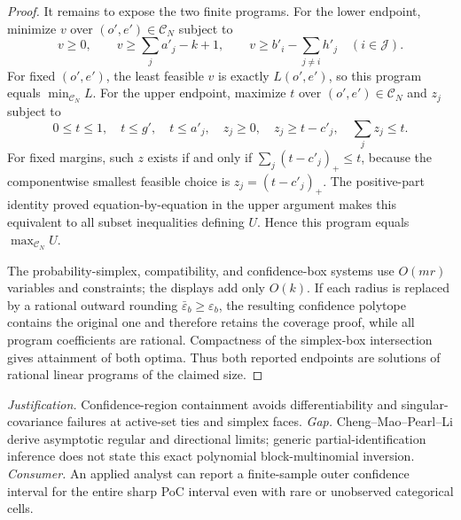 \documentclass{article}
\begin{document}
\begin{proof}
It remains to expose the two finite programs.  For the lower endpoint, minimize \(v\) over \((o',e')\in\mathcal C_N\) subject to
\[
 v\geq0,
 \qquad v\geq\sum_ja'_j-k+1,
 \qquad v\geq b'_i-\sum_{j\ne i}h'_j\quad(i\in\mathcal J).
\]
For fixed \((o',e')\), the least feasible \(v\) is exactly \(L(o',e')\), so this program equals \(\min_{\mathcal C_N}L\).  For the upper endpoint, maximize \(t\) over \((o',e')\in\mathcal C_N\) and \(z_j\) subject to
\[
 0\leq t\leq1,
 \quad t\leq g',
 \quad t\leq a'_j,
 \quad z_j\geq0,
 \quad z_j\geq t-c'_j,
 \quad \sum_jz_j\leq t.
\]
For fixed margins, such \(z\) exists if and only if \(\sum_j(t-c'_j)_+\leq t\), because the componentwise smallest feasible choice is \(z_j=(t-c'_j)_+\).  The positive-part identity proved equation-by-equation in the upper argument makes this equivalent to all subset inequalities defining \(U\).  Hence this program equals \(\max_{\mathcal C_N}U\).

The probability-simplex, compatibility, and confidence-box systems use \(O(mr)\) variables and constraints; the displays add only \(O(k)\).  If each radius is replaced by a rational outward rounding \(\bar\varepsilon_b\geq\varepsilon_b\), the resulting confidence polytope contains the original one and therefore retains the coverage proof, while all program coefficients are rational.  Compactness of the simplex-box intersection gives attainment of both optima.  Thus both reported endpoints are solutions of rational linear programs of the claimed size.
\end{proof}
\par\smallskip\noindent \textit{Justification.} Confidence-region containment avoids differentiability and singular-covariance failures at active-set ties and simplex faces. \textit{Gap.} Cheng--Mao--Pearl--Li derive asymptotic regular and directional limits; generic partial-identification inference does not state this exact polynomial block-multinomial inversion. \textit{Consumer.} An applied analyst can report a finite-sample outer confidence interval for the entire sharp PoC interval even with rare or unobserved categorical cells.
\end{document}
